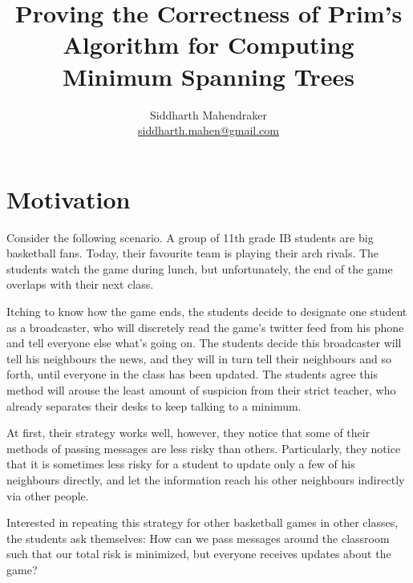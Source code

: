 \documentclass[a4paper,11pt]{report}
\theoremstyle{plain}
\theoremstyle{definition}
\begin{document}
\title{Proving the Correctness of Prim's Algorithm for Computing
Minimum Spanning Trees}
\author{Siddharth Mahendraker\\
    \url{siddharth.mahen@gmail.com}}
\maketitle

\renewcommand{\cfttoctitlefont}{\Large\bfseries}
\setlength\cftaftertoctitleskip{1em}
\setlength\cftbeforesecskip{0.5em}

\setcounter{page}{1}
\tableofcontents
\clearpage
\setcounter{page}{1}

\section{Motivation}


Consider the following scenario. A group of 11th grade IB students are big
basketball fans. Today, their favourite team is playing their arch rivals.
The students watch the game during lunch, but unfortunately, the end of the
game overlaps with their next class.

Itching to know how the game ends, the students decide to designate one
student as a broadcaster, who will discretely read the game's twitter
feed from his phone and tell everyone else what's going on. The students
decide this broadcaster will tell his neighbours the news, and they will in
turn tell their neighbours and so forth, until everyone in the class has
been updated. The students agree this method will arouse the least amount
of suspicion from their strict teacher, who already separates their desks
to keep talking to a minimum.

At first, their strategy works well, however, they notice that some of their
methods of passing messages are less risky than others. Particularly, they
notice that it is sometimes less risky for a student to update only a few of
his neighbours directly, and let the information reach his other neighbours
indirectly via other people.

Interested in repeating this strategy for other basketball games in other
classes, the students ask themselves: How can we pass messages around
the classroom such that our total risk is minimized, but everyone receives
updates about the game?
\end{document}
